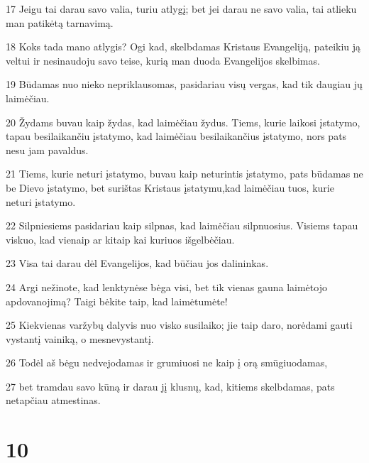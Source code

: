 \par 17 Jeigu tai darau savo valia, turiu atlygį; bet jei darau ne savo valia, tai atlieku man patikėtą tarnavimą. 
\par 18 Koks tada mano atlygis? Ogi kad, skelbdamas Kristaus Evangeliją, pateikiu ją veltui ir nesinaudoju savo teise, kurią man duoda Evangelijos skelbimas. 
\par 19 Būdamas nuo nieko nepriklausomas, pasidariau visų vergas, kad tik daugiau jų laimėčiau. 
\par 20 Žydams buvau kaip žydas, kad laimėčiau žydus. Tiems, kurie laikosi įstatymo, tapau besilaikančiu įstatymo, kad laimėčiau besilaikančius įstatymo, nors pats nesu jam pavaldus. 
\par 21 Tiems, kurie neturi įstatymo, buvau kaip neturintis įstatymo,­ pats būdamas ne be Dievo įstatymo, bet surištas Kristaus įstatymu,­kad laimėčiau tuos, kurie neturi įstatymo. 
\par 22 Silpniesiems pasidariau kaip silpnas, kad laimėčiau silpnuosius. Visiems tapau viskuo, kad vienaip ar kitaip kai kuriuos išgelbėčiau. 
\par 23 Visa tai darau dėl Evangelijos, kad būčiau jos dalininkas. 
\par 24 Argi nežinote, kad lenktynėse bėga visi, bet tik vienas gauna laimėtojo apdovanojimą? Taigi bėkite taip, kad laimėtumėte! 
\par 25 Kiekvienas varžybų dalyvis nuo visko susilaiko; jie taip daro, norėdami gauti vystantį vainiką, o mes­nevystantį. 
\par 26 Todėl aš bėgu nedvejodamas ir grumiuosi ne kaip į orą smūgiuodamas, 
\par 27 bet tramdau savo kūną ir darau jį klusnų, kad, kitiems skelbdamas, pats netapčiau atmestinas.


\chapter{10}


